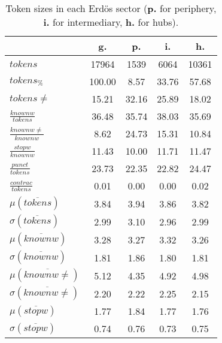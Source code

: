 \begin{table}[h!]
\begin{center}
\begin{tabular}{| l || c | c | c | c |}\hline
 & {\bf g.} & {\bf p.} & {\bf i.} & {\bf h.} \\\hline\hline
$tokens$ & 17964  & 1539  & 6064  & 10361 \\
$tokens_{\%}$ & 100.00  & 8.57  & 33.76  & 57.68 \\
$tokens \neq$ & 15.21  & 32.16  & 25.89  & 18.02 \\\hline
$\frac{knownw}{tokens}$ & 36.48  & 35.74  & 38.03  & 35.69 \\
$\frac{knownw \neq}{knownw}$ & 8.62  & 24.73  & 15.31  & 10.84 \\\hline
$\frac{stopw}{knownw}$ & 11.43  & 10.00  & 11.71  & 11.47 \\
$\frac{punct}{tokens}$ & 23.73  & 22.35  & 22.82  & 24.47 \\
$\frac{contrac}{tokens}$ & 0.01  & 0.00  & 0.00  & 0.02 \\\hline\hline
$\mu(\overline{tokens})$ & 3.84  & 3.94  & 3.86  & 3.82 \\
$\sigma(\overline{tokens})$ & 2.99  & 3.10  & 2.96  & 2.99 \\\hline
$\mu(\overline{knownw})$ & 3.28  & 3.27  & 3.32  & 3.26 \\
$\sigma(\overline{knownw})$ & 1.81  & 1.86  & 1.80  & 1.81 \\\hline
$\mu(\overline{knownw \neq})$ & 5.12  & 4.35  & 4.92  & 4.98 \\
$\sigma(\overline{knownw \neq})$ & 2.20  & 2.22  & 2.25  & 2.15 \\\hline
$\mu(\overline{stopw})$ & 1.77  & 1.84  & 1.77  & 1.76 \\
$\sigma(\overline{stopw})$ & 0.74  & 0.76  & 0.73  & 0.75 \\\hline
\end{tabular}
\caption{Token sizes in each Erd\"os sector ({{\bf p.}} for periphery, {{\bf i.}} for intermediary, {{\bf h.}} for hubs).}
\end{center}
\end{table}